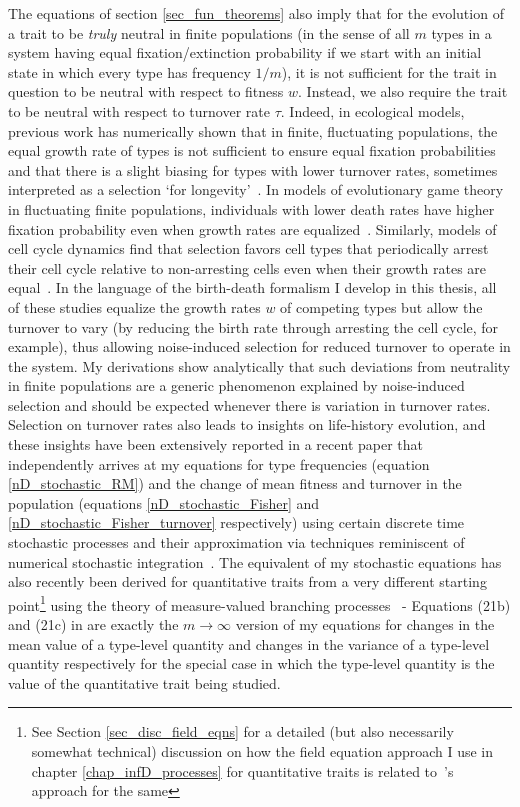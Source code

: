 The equations of section \ref{sec_fun_theorems} also imply that for the evolution of a trait to be \emph{truly} neutral in finite populations (in the sense of all $m$ types in a system having equal fixation/extinction probability if we start with an initial state in which every type has frequency $1/m$), it is not sufficient for the trait in question to be neutral with respect to fitness $w$. Instead, we also require the trait to be neutral with respect to turnover rate $\tau$.  Indeed, in ecological models, previous work has numerically shown that in finite, fluctuating populations, the equal growth rate of types is not sufficient to ensure equal fixation probabilities and that there is a slight biasing for types with lower turnover rates, sometimes interpreted as a selection `for longevity'~\citep{lin_features_2012, oliveira_advantage_2017,balasekaran_quasi-neutral_2022}. In models of evolutionary game theory in fluctuating finite populations, individuals with lower death rates have higher fixation probability even when growth rates are equalized~\citep{huang_stochastic_2015, czuppon_fixation_2018}. Similarly, models of cell cycle dynamics find that selection favors cell types that periodically arrest their cell cycle relative to non-arresting cells even when their growth rates are equal~\citep{wodarz_effect_2017}. In the language of the birth-death formalism I develop in this thesis, all of these studies equalize the growth rates $w$ of competing types but allow the turnover to vary (by reducing the birth rate through arresting the cell cycle, for example), thus allowing noise-induced selection for reduced turnover to operate in the system. My derivations show analytically that such deviations from neutrality in finite populations are a generic phenomenon explained by noise-induced selection and should be expected whenever there is variation in turnover rates. Selection on turnover rates also leads to insights on life-history evolution, and these insights have been extensively reported in a recent paper that independently arrives at my equations for type frequencies (equation \eqref{nD_stochastic_RM}) and the change of mean fitness and turnover in the population (equations \eqref{nD_stochastic_Fisher} and \eqref{nD_stochastic_Fisher_turnover} respectively) using certain discrete time stochastic processes and their approximation via techniques reminiscent of numerical stochastic integration~\citep{kuosmanen_turnover_2022}. The equivalent of my stochastic equations has also recently been derived for quantitative traits from a very different starting point\footnote{See Section \ref{sec_disc_field_eqns} for a detailed (but also necessarily somewhat technical) discussion on how the field equation approach I use in chapter \ref{chap_infD_processes} for quantitative traits is related to~\cite{week_white_2021}'s approach for the same} using the theory of measure-valued branching processes~\citep{week_white_2021} - Equations (21b) and (21c) in \cite{week_white_2021} are exactly the $m \to \infty$ version of my equations for changes in the mean value of a type-level quantity and changes in the variance of a type-level quantity respectively for the special case in which the type-level quantity is the value of the quantitative trait being studied.

